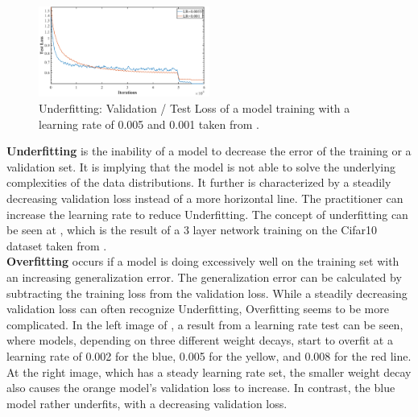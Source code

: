 \begin{figure}
\centering
\includegraphics[width=0.50\textwidth]{Bilder/underfitting.png}
\captionsetup{width=0.50\textwidth}
\caption{Underfitting: Validation / Test Loss of a model training with a learning rate of 0.005 and 0.001 taken from \cite{DBLP:journals/corr/abs-1803-09820}.}
\label{underfitting}
\end{figure}

\textbf{Underfitting} is the inability of a model to decrease the error of the training or a validation set. It is implying that the model is not able to solve the underlying complexities of the data distributions. It further is characterized by a steadily decreasing validation loss instead of a more horizontal line. The practitioner can increase the learning rate to reduce Underfitting. The concept of underfitting can be seen at , which is the result of a 3 layer network training on the Cifar10 \cite{cifar} dataset taken from \cite{DBLP:journals/corr/abs-1803-09820}.\\

\textbf{Overfitting} occurs if a model is doing excessively well on the training set with an increasing generalization error. The generalization error can be calculated by subtracting the training loss from the validation loss. While a steadily decreasing validation loss can often recognize Underfitting, Overfitting seems to be more complicated. In the left image of , a result from a learning rate test can be seen, where models, depending on three different weight decays, start to overfit at a learning rate of 0.002 for the blue, 0.005 for the yellow, and 0.008 for the red line. At the right image, which has a steady learning rate set, the smaller weight decay also causes the orange model's validation loss to increase. In contrast, the blue model rather underfits, with a decreasing validation loss.

